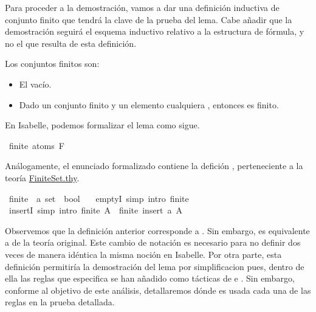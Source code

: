 \begin{isabellebody}
\begin{isamarkuptext}
  Para proceder a la demostración, vamos a dar una definición inductiva de conjunto 
  finito que tendrá la clave de la prueba del lema. Cabe añadir que la demostración seguirá el 
  esquema inductivo relativo a la estructura de fórmula, y no el que resulta de esta definición.

  \begin{definicion}
    Los conjuntos finitos son:
      \begin{itemize}
        \item El vacío.
        \item Dado un conjunto finito  y un elemento cualquiera , entonces  es 
        finito.
      \end{itemize}
  \end{definicion}


  En Isabelle, podemos formalizar el lema como sigue.%
\end{isamarkuptext}\isamarkuptrue%
\isamarkupfalse%
\ {\isachardoublequoteopen}finite\ {\isacharparenleft}atoms\ F{\isacharparenright}{\isachardoublequoteclose}\isanewline
%
\isadelimproof
\ \ %
\endisadelimproof
%
\isatagproof
{}\isamarkupfalse%
%
\endisatagproof
{\isafoldproof}%
%
\isadelimproof
%
\endisadelimproof
%
\begin{isamarkuptext}%
Análogamente, el enunciado formalizado contiene la defición , 
  perteneciente a la teoría \href{https://n9.cl/x86r}{FiniteSet.thy}.%
\end{isamarkuptext}\isamarkuptrue%
\isamarkupfalse%
\ finite{\isacharprime}\ {\isacharcolon}{\isacharcolon}\ {\isachardoublequoteopen}{\isacharprime}a\ set\ {\isasymRightarrow}\ bool{\isachardoublequoteclose}\ \isanewline
\ \ emptyI{\isacharprime}\ {\isacharbrackleft}simp{\isacharcomma}\ intro{\isacharbang}{\isacharbrackright}{\isacharcolon}\ {\isachardoublequoteopen}finite{\isacharprime}\ {\isacharbraceleft}{\isacharbraceright}{\isachardoublequoteclose}\isanewline
{\isacharbar}\ insertI{\isacharprime}\ {\isacharbrackleft}simp{\isacharcomma}\ intro{\isacharbang}{\isacharbrackright}{\isacharcolon}\ {\isachardoublequoteopen}finite{\isacharprime}\ A\ {\isasymLongrightarrow}\ finite{\isacharprime}\ {\isacharparenleft}insert\ a\ A{\isacharparenright}{\isachardoublequoteclose}%
\begin{isamarkuptext}%
Observemos que la definición anterior corresponde a . Sin embargo, es 
  equivalente a  de la teoría original. Este cambio de notación es necesario para 
  no definir dos veces de manera idéntica la misma noción en Isabelle. Por otra parte, esta
  definición permitiría la demostración del lema por 
  simplificacion pues, dentro de ella las reglas que especifica se han añadido como tácticas de 
   e . Sin embargo, conforme al objetivo de este análisis, detallaremos dónde es usada
  cada una de las reglas en la prueba detallada. 
 

\end{isamarkuptext}
\end{isabellebody}
